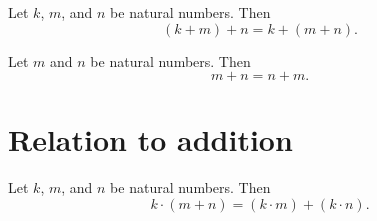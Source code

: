 \begin{proposition}[Associative]
Let $k$, $m$, and $n$ be natural numbers.
Then
\[
(k + m) + n = k + (m + n).
\]
\end{proposition}

\begin{proposition}[Commutative]
Let $m$ and $n$ be natural numbers.
Then
\[
m + n = n + m.
\]
\end{proposition}

\section*{Relation to addition}

\begin{proposition}[Distributive]
Let $k$, $m$, and $n$ be natural numbers.
Then
\[
k \cdot  (m + n) = (k \cdot  m) + (k \cdot  n).
\]
\end{proposition}
